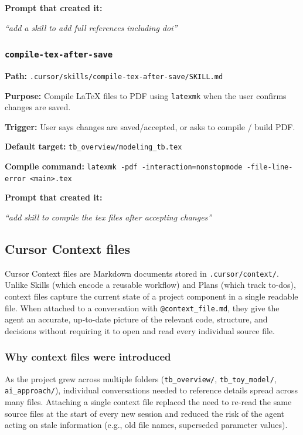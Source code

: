 \documentclass[11pt]{article}
\begin{document}
\textbf{Prompt that created it:}
\begin{promptbox}
\textit{``add a skill to add full references including doi''}
\end{promptbox}

\subsubsection{\texttt{compile-tex-after-save}}

\textbf{Path:} \texttt{.cursor/skills/compile-tex-after-save/SKILL.md}

\textbf{Purpose:} Compile LaTeX files to PDF using \texttt{latexmk} when the user confirms changes are saved.

\textbf{Trigger:} User says changes are saved/accepted, or asks to compile / build PDF.

\textbf{Default target:} \texttt{tb\_overview/modeling\_tb.tex}

\textbf{Compile command:} \verb|latexmk -pdf -interaction=nonstopmode -file-line-error <main>.tex|

\textbf{Prompt that created it:}
\begin{promptbox}
\textit{``add skill to compile the tex files after accepting changes''}
\end{promptbox}

\subsection{Cursor Context files}
\label{sec:contexts}

Cursor Context files are Markdown documents stored in \texttt{.cursor/context/}. Unlike Skills (which encode a reusable workflow) and Plans (which track to-dos), context files capture the current state of a project component in a single readable file. When attached to a conversation with \texttt{@context\_file.md}, they give the agent an accurate, up-to-date picture of the relevant code, structure, and decisions without requiring it to open and read every individual source file.

\subsubsection{Why context files were introduced}

As the project grew across multiple folders (\texttt{tb\_overview/}, \texttt{tb\_toy\_model/}, \texttt{ai\_approach/}), individual conversations needed to reference details spread across many files. Attaching a single context file replaced the need to re-read the same source files at the start of every new session and reduced the risk of the agent acting on stale information (e.g., old file names, superseded parameter values).
\end{document}
